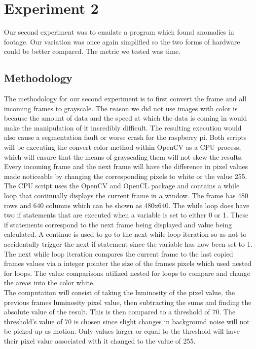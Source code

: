 \documentclass[conference]{IEEEtran}
\begin{document}
\section{Experiment 2}
Our second experiment was to emulate a program which found anomalies in footage. Our variation was once again simplified so the two forms of hardware could be better compared. The metric we tested was time.

\subsection{Methodology}
The methodology for our second experiment is to first convert the frame and all incoming frames to grayscale. The reason we did not use images with color is because the amount of data and the speed at which the data is coming in would make the manipulation of it incredibly difficult. The resulting execution would also cause a segmentation fault or worse crash for the raspberry pi. Both scripts will be executing the convert color method within OpenCV as a CPU process, which will ensure that the means of grayscaling them will not skew the results. Every incoming frame and the next frame will have the difference in pixel values made noticeable by changing the corresponding pixels to white or the value 255.\\
The CPU script uses the OpenCV and OpenCL package and contains a while loop that continually displays the current frame in a window. The frame has 480 rows and 640 columns which can be shown as 480x640. The while loop does have two if statements that are executed when a variable is set to either 0 or 1. These if statements correspond to the next frame being displayed and value being calculated. A continue is used to go to the next while loop iteration so as not to accidentally trigger the next if statement since the variable has now been set to 1. The next while loop iteration compares the current frame to the last copied frames values via a integer pointer the size of the frames pixels which used nested for loops. The value comparisons utilized nested for loops to compare and change the areas into the color white.\\ 
The computation will consist of taking the luminosity of the pixel value, the previous frames luminosity pixel value, then subtracting the sums and finding the absolute value of the result. This is then compared to a threshold of 70. The threshold's value of 70 is chosen since slight changes in background noise will not be picked up as motion. Only values larger or equal to the threshold will have their pixel value associated with it changed to the value of 255.\\
\end{document}
